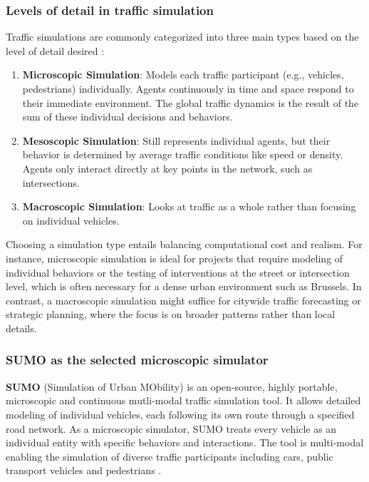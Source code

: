 \subsubsection{Levels of detail in traffic simulation}
Traffic simulations are commonly categorized into three main types based on the level of detail
desired \cite{modelling_transport,SUMO_sumo}:
\begin{enumerate} 
    \item \textbf{Microscopic Simulation}: Models each traffic participant (e.g., vehicles, pedestrians) individually. Agents continuously in time and space respond to their immediate environment. The global traffic dynamics is the result of the sum of these individual decisions and behaviors.
    \item \textbf{Mesoscopic Simulation}: Still represents individual agents, but their behavior is determined by average traffic conditions like speed or density. Agents only interact directly at key points in the network, such as intersections.
    \item \textbf{Macroscopic Simulation}: Looks at traffic as a whole rather than focusing on individual vehicles.
\end{enumerate}
Choosing a simulation type entails balancing computational cost and realism. For instance, microscopic simulation is ideal for projects that require modeling of individual behaviors or the testing of interventions at the street or intersection level, which is often necessary for a dense urban environment such as Brussels. In contrast, a macroscopic simulation might suffice for citywide traffic forecasting or strategic planning, where the focus is on broader patterns rather than local details.

\subsubsection{SUMO as the selected microscopic simulator}
\textbf{SUMO} (Simulation of Urban MObility) is an open-source, highly portable, microscopic and continuous mutli-modal traffic simulation tool. It allows detailed modeling of individual vehicles, each following its own route through a specified road network. As a microscopic simulator, SUMO treats every vehicle as an individual entity with specific behaviors and interactions. The tool is multi-modal enabling the simulation of diverse traffic participants including cars, public transport vehicles and pedestrians 
\cite{SUMO_eclipse} \cite{SUMO_homepage} \cite{SUMO_doc_glance}. 

